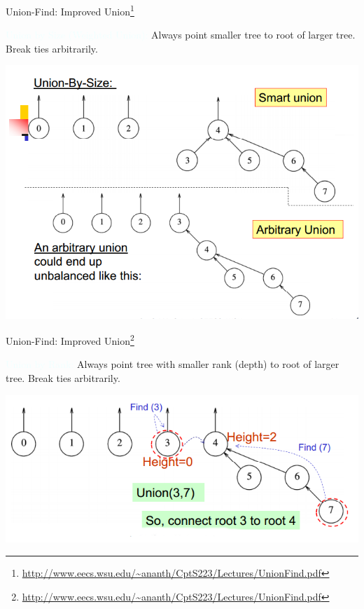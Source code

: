 \documentclass{beamer}
\newcommand{\tblue}[1]{{\Large {\textcolor{azure}{#1}}}}
\begin{document}
\begin{frame}{Union-Find: Improved Union\footnote{\url{http://www.eecs.wsu.edu/~ananth/CptS223/Lectures/UnionFind.pdf}}}

\tblue{Union by Size (Weighted Union):} Always point smaller tree to root of larger tree. Break ties arbitrarily.
    \begin{center}
        \includegraphics[scale=0.3]{unionBySize.png} 
    \end{center}
\end{frame}

\begin{frame}{Union-Find: Improved Union\footnote{\url{http://www.eecs.wsu.edu/~ananth/CptS223/Lectures/UnionFind.pdf}}}

\tblue{Union by Rank:} Always point tree with smaller rank (depth) to root of larger tree. Break ties arbitrarily.
    \begin{center}
        \includegraphics[scale=0.5]{unionByRank.png} 
    \end{center}
\end{frame}
\end{document}
